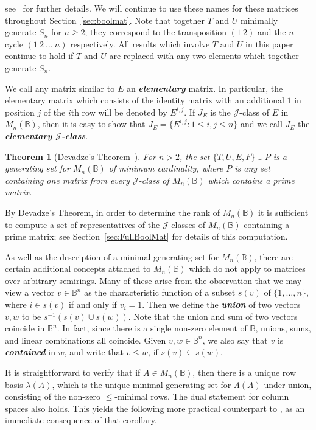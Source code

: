 \documentclass[11pt]{article}
\newtheorem{thm}{Theorem}[subsection]
\newcommand{\defn}[1]{\textbf{\textit{#1}}}
\numberwithin{equation}{section}
\newcommand{\set}[2]{\ensuremath{\{#1 : #2 \}}}
\newcommand{\B}{\mathbb{B}}
\newcommand{\Bn}{M_n(\B)}
\newcommand{\J}{\mathscr{J}}
\newcommand{\RowS}{\Lambda}
\newcommand{\RowB}{\lambda}
\begin{document}
see~\cite{Roush1977aa} for further details.
We will continue to use these names for these matrices throughout
Section~\ref{sec:boolmat}. Note that together $T$ and $U$ minimally generate
$S_n$ for $n \geq 2$; they correspond to the transposition $(1~2)$ and the
$n$-cycle $(1~2~\ldots~n)$ respectively. All results which involve $T$ and $U$
in this paper continue to hold if $T$ and $U$ are replaced with any two elements
which together generate $S_n$.

We call any matrix similar to $E$ an \defn{elementary} matrix. In particular,
the elementary matrix which consists of the identity matrix with an additional
$1$ in position $j$ of the $i$th row will be denoted by $E^{i,j}$. If $J_E$ is
the $\J$-class of $E$ in $\Bn$, then it is easy to show that $J_E =
\set{E^{i,j}}{1 \leq i, j \leq n}$ and we call $J_E$ the \defn{elementary
  $\J$-class}. 
\begin{thm}[Devadze's Theorem~\cite{Konieczny2011aa}]
  For $n > 2$, the set $\{T, U, E, F\} \cup P$ is a generating set for $\Bn$ of
  minimum cardinality, where $P$ is any set containing one matrix from every
  $\J$-class of $\Bn$ which contains a prime matrix. 
\end{thm}
By Devadze's Theorem, in order to determine the rank of $\Bn$ it is sufficient
to compute a set of representatives of the $\J$-classes of $\Bn$ containing a
prime matrix; see Section~\ref{sec:FullBoolMat} for details of this computation.

As well as the description of a minimal generating set for $\Bn$, there are
certain additional concepts attached to $\Bn$ which do not apply to matrices
over arbitrary semirings. Many of these arise from the observation that we may
view a vector $v \in \B^n$ as the characteristic function of a subset $s(v)$ of
$\{1, \ldots, n\}$, where $i \in s(v)$ if and only if $v_i = 1$.  Then we define
the \defn{union} of two vectors $v, w$ to be $s^{-1}(s(v) \cup s(w))$. Note that
the union and sum of two vectors coincide in $\B^n$. In fact, since there is a
single non-zero element of $\B$, unions, sums, and linear combinations all
coincide. Given $v, w \in \B^n$, we also say that $v$ is \defn{contained} in
$w$, and write that $v \leq w$, if $s(v) \subseteq s(w)$.

It is straightforward to verify that if $A \in \Bn$, then there is a unique row
basis $\RowB(A)$, which is the unique minimal generating set for $\RowS(A)$
under union, consisting of the non-zero $\leq$-minimal rows. The dual statement
for column spaces also holds. This yields the following more practical
counterpart to , as an immediate consequence of
that corollary.
\end{document}

